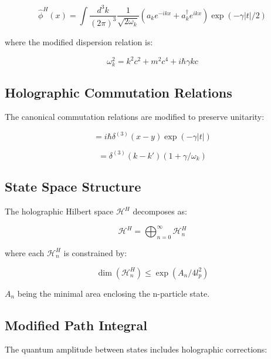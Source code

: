 \documentclass[12pt]{article}
\theoremstyle{plain}
\theoremstyle{definition}
\theoremstyle{remark}
\begin{document}
\begin{equation}
\hat{\phi}^H(x) = \int \frac{d^3k}{(2\pi)^3} \frac{1}{\sqrt{2\omega_k}} 
\left(a_k e^{-ikx} + a_k^{\dagger} e^{ikx}\right)\exp(-\gamma|t|/2)
\end{equation}

where the modified dispersion relation is:

\begin{equation}
\omega_k^2 = k^2c^2 + m^2c^4 + i\hbar\gamma kc
\end{equation}

\subsection{Holographic Commutation Relations}

The canonical commutation relations are modified to preserve unitarity:

\begin{equation}
[\hat{\phi}^H(x), \hat{\pi}^H(y)] = i\hbar\delta^{(3)}(x-y)\exp(-\gamma|t|)
\end{equation}

\begin{equation}
[a_k, a_{k'}^{\dagger}] = \delta^{(3)}(k-k')(1 + \gamma/\omega_k)
\end{equation}

\subsection{State Space Structure}

The holographic Hilbert space $\mathcal{H}^H$ decomposes as:

\begin{equation}
\mathcal{H}^H = \bigoplus_{n=0}^{\infty} \mathcal{H}_n^H
\end{equation}

where each $\mathcal{H}_n^H$ is constrained by:

\begin{equation}
\dim(\mathcal{H}_n^H) \leq \exp(A_n/4l_p^2)
\end{equation}

$A_n$ being the minimal area enclosing the n-particle state.

\subsection{Modified Path Integral}

The quantum amplitude between states includes holographic corrections:
\end{document}
